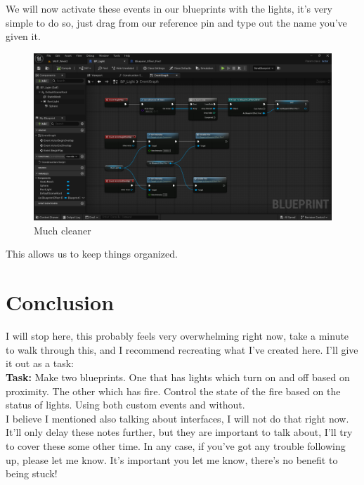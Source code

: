 \documentclass[]{article}
\begin{document}
	We will now activate these events in our blueprints with the lights, it's very simple to do so, just drag from our reference pin and type out the name you've given it.
	
	\begin{figure}[h]
		\centering
		\includegraphics[width=0.8\linewidth]{week2part2/screenshot022}
		\caption{Much cleaner}
		\label{fig:screenshot022}
	\end{figure}
	
	This allows us to keep things organized.
	
	\section{Conclusion}
	I will stop here, this probably feels very overwhelming right now, take a minute to walk through this, and I recommend recreating what I've created here. I'll give it out as a task:
	\\[10pt]
	\textbf{Task:} Make two blueprints. One that has lights which turn on and off based on proximity. The other which has fire. Control the state of the fire based on the status of lights. Using both custom events and without.
	\\[10pt]
	I believe I mentioned also talking about interfaces, I will not do that right now. It'll only delay these notes further, but they are important to talk about, I'll try to cover these some other time.
	In any case, if you've got any trouble following up, please let me know. It's important you let me know, there's no benefit to being stuck!
	
	
	
	
	
	
	
	
	
\end{document}
